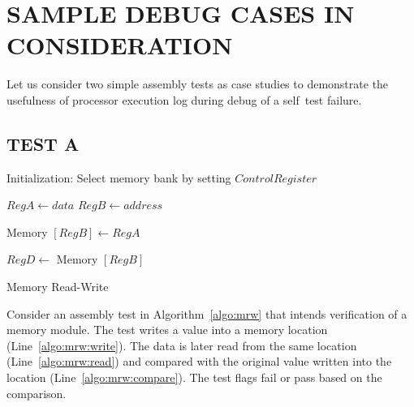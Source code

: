 \section {SAMPLE DEBUG CASES IN CONSIDERATION}
\label{sec:enhancement.tex.sdcic}
Let us consider two simple assembly tests as case studies to demonstrate the usefulness of processor execution log during debug of a self~test failure.
\subsection {TEST A}
\label{case:testa}



\IncMargin{1em}
\begin{algorithm}[h]
\DontPrintSemicolon
{}

\BlankLine
Initialization: Select memory bank by setting $Control Register$ \;

	$Reg A \longleftarrow data$\;
	$Reg B \longleftarrow address$\; \label{algo:mrw:write}

	Memory $[Reg B] \longleftarrow Reg A $\;

	$Reg D \longleftarrow$	Memory $[Reg B]$\;  \label{algo:mrw:read}


\caption{Memory Read-Write}
\label{algo:mrw}
\end{algorithm}\DecMargin{1em}


Consider an assembly test in Algorithm~\ref{algo:mrw} that intends verification of a memory module. The test writes a value into a memory location (Line~\ref{algo:mrw:write}). The data is later read from the same location (Line~\ref{algo:mrw:read}) and compared with the original value written into the location (Line~\ref{algo:mrw:compare}). The test flags fail or pass based on the comparison.

